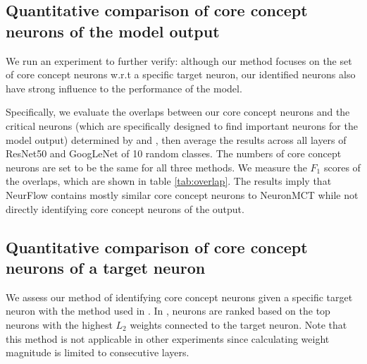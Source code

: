 \subsection{{Quantitative comparison of core concept neurons of the model output}}
\label{sec:compare_to_model_output}
{We run an experiment to further verify: although our method focuses on the set of core concept neurons w.r.t a specific target neuron, our identified neurons also have strong influence to the performance of the model.}

{Specifically, we evaluate the overlaps between our core concept neurons and the critical neurons (which are specifically designed to find important neurons for the model output) determined by \citet{neuronmct} and \citet{NEUCEPT}, then average the results across all layers of ResNet50 and GoogLeNet of 10 random classes. The numbers of core concept neurons are set to be the same for all three methods. We measure the $F_1$ scores of the overlaps, which are shown in table \ref{tab:overlap}. The results imply that NeurFlow contains mostly similar core concept neurons to NeuronMCT while not directly identifying core concept neurons of the output.}

\begin{table}[t]
\caption{{Overlapping ratio of critical neurons between NeuronMCT \citep{neuronmct}, NeuCEPT \citep{NEUCEPT}, and core concept neurons of NeurFlow}}
\label{tab:overlap}
\begin{center}
\renewcommand{\arraystretch}{1.2}
\end{center}
\end{table}

\subsection{{Quantitative comparison of core concept neurons of a target neuron}}
\label{sec:compare_to_target_neuron}
{We assess our method of identifying core concept neurons given a specific target neuron with the method used in \citet{Olah}. In \citet{Olah}, neurons are ranked based on the top neurons with the highest $L_2$ weights connected to the target neuron. Note that this method is not applicable in other experiments since calculating weight magnitude is limited to consecutive layers.}

